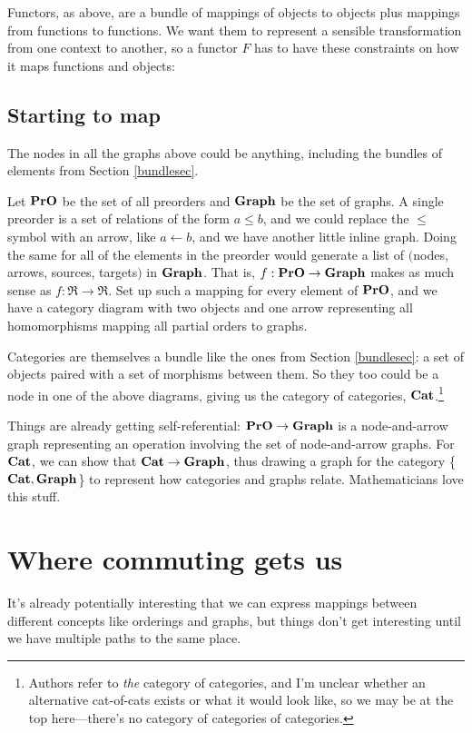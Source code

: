 \documentclass[11pt]{article}
\begin{document}
Functors, as above, are a bundle of mappings of objects to objects plus mappings from
functions to functions.  We want them to represent a sensible transformation from one
context to another, so a functor $F$ has to have these constraints on how it maps
functions and objects:

\subsection{Starting to map}
The nodes in all the graphs above could be anything, including the bundles of elements from
Section \ref{bundlesec}.

Let ${\bf PrO}$ be the set of all preorders and ${\bf Graph}$ be the set of graphs. A
single preorder is a set of relations of the form $a \leq b$, and we could replace the $\leq$
symbol with an arrow, like $a\leftarrow b$, and we have another little inline graph. 
Doing the same for all of the elements in the preorder would generate a list of
$($nodes, arrows, sources, targets$)$ in ${\bf Graph}$.
That is, $f:{\bf PrO}\to {\bf Graph}$ makes as much sense as $f:\Re \to \Re$. Set up such
a mapping for every element of ${\bf PrO}$, and we have a category diagram with two
objects and one arrow representing all homomorphisms mapping all partial orders to graphs.

Categories are themselves a bundle like the ones from Section \ref{bundlesec}: a set
of objects paired with a set of morphisms between them. So they too could be a node in
one of the above diagrams, giving us the category of categories, ${\bf Cat}$.\footnote{Authors refer
to {\em the} category of categories, and I'm unclear whether an alternative cat-of-cats
exists or what it would look like, so we may be at the top here---there's no category of
categories of categories.}

Things are already getting self-referential: ${\bf PrO}\to {\bf Graph}$ is a
node-and-arrow graph representing an operation involving the set of node-and-arrow
graphs. For ${\bf Cat}$, we can show that ${\bf Cat}\to {\bf Graph}$, thus drawing a
graph for the category \{${\bf Cat}, {\bf Graph}$\} to represent how categories and
graphs relate.  Mathematicians love this stuff.

\section{Where commuting gets us} It's already potentially interesting that we can
express mappings between different concepts like orderings and graphs, but things don't get
interesting until we have multiple paths to the same place.
\end{document}
